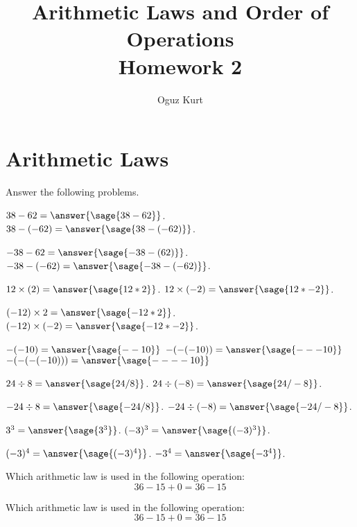 \documentclass{ximera}
\title{Arithmetic Laws and Order of Operations \\ Homework 2}
\author{Oguz Kurt}
\begin{document}
\maketitle


\section*{Arithmetic Laws}
\begin{problem} Answer the following problems.

$38 - 62 =\answer{\sage{38-62}}$.
\hfill
$38 - (-62) =\answer{\sage{38-(-62)}}$.

$-38 - 62 =\answer{\sage{-38-(62)}}$.
\hfill
$-38 - (-62) =\answer{\sage{-38-(-62)}}$.

$12\times (2)=\answer{\sage{12*2}}$.
\hfill
$12\times (-2)=\answer{\sage{12*-2}}$.

$(-12)\times 2=\answer{\sage{-12*2}}$.
\hfill
$(-12)\times (-2)=\answer{\sage{-12*-2}}$.

$-(-10)=\answer{\sage{--10}}$
\hfill
$-(-(-10))=\answer{\sage{---10}}$
\hfill
$-(-(-(-10)))=\answer{\sage{----10}}$

$24\div 8=\answer{\sage{24/8}}$.
\hfill
$24\div (-8)=\answer{\sage{24/-8}}$.

$-24\div 8=\answer{\sage{-24/8}}$.
\hfill
$-24\div (-8)=\answer{\sage{-24/-8}}$.

$3^3=\answer{\sage{3^3}}$.
\hfill
$(-3)^3=\answer{\sage{(-3)^3}}$.

$(-3)^4=\answer{\sage{(-3)^4}}$.
\hfill
$-3^4=\answer{\sage{-3^4}}$.

\end{problem}

\begin{problem}
Which arithmetic law is used in the following operation:
$$36-15+0=36-15$$

\begin{multipleChoice}
\end{multipleChoice}
\end{problem}


\begin{problem}
Which arithmetic law is used in the following operation:
$$36-15+0=36-15$$

\begin{multipleChoice}
\end{multipleChoice}
\end{problem}
\end{document}
